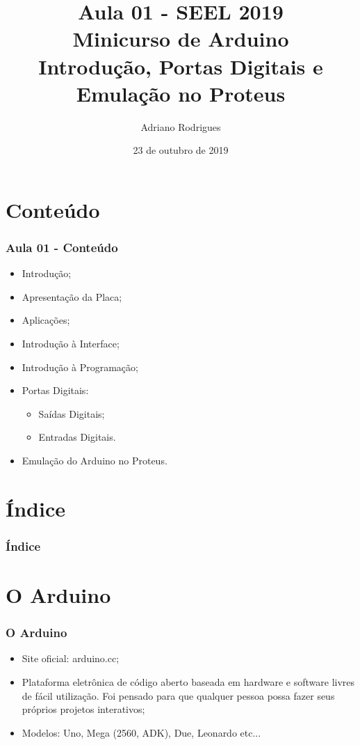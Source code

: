\documentclass{beamer}
\title[Intro, P. Digitais e Emulação no Proteus]{Aula 01 - SEEL 2019\\Minicurso de Arduino \\ Introdução, Portas Digitais e Emulação no Proteus}
\author[Adriano]{Adriano Rodrigues}
\date{23 de outubro de 2019}
\begin{document}
\begin{frame}
	\titlepage
\end{frame}

\section{Conteúdo}
\begin{frame}
\frametitle{Aula 01 - Conteúdo}
	\begin{itemize}
		\item Introdução;
		\item Apresentação da Placa;
		\item Aplicações;
		\item Introdução à Interface;
		\item Introdução à Programação;
		\item Portas Digitais:
		\begin{itemize}
			\item Sa\'idas Digitais;
			\item Entradas Digitais.
		\end{itemize}
		\item Emulação do Arduino no Proteus.
	\end{itemize}
\end{frame}

\section{Índice}
\begin{frame}
\frametitle{Índice}
\begin{multicols}{2}
\tableofcontents
\end{multicols}
\end{frame}

\section{O Arduino}
\begin{frame}
\frametitle{O Arduino}
	\begin{itemize}
		\item Site oficial: arduino.cc;
		\item Plataforma eletrônica de código aberto baseada em hardware e software livres de fácil utilização. Foi pensado para que qualquer pessoa possa fazer seus próprios projetos interativos;
		\item Modelos: Uno, Mega (2560, ADK), Due, Leonardo etc...
	\end{itemize}
\end{frame}
\end{document}

